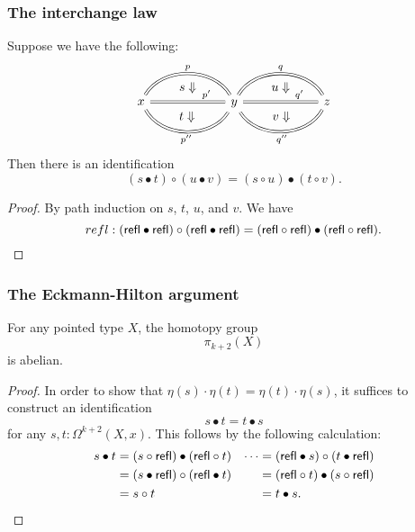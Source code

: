 \documentclass[handout]{beamer}
\newcommand{\ct}{\bullet}
\newcommand{\refl}{\mathsf{refl}}
\begin{document}
\begin{frame}
  \frametitle{The interchange law}
  \begin{lemma}
    Suppose we have the following:
    \begin{equation*}
      \begin{tikzcd}[ampersand replacement=\&,column sep=6em]
        x \arrow[r,bend left=60,equals,""{name=A,below},"{p}"]
        \arrow[r,equals,""{name=B,above},""{name=C,below},"{p'}"{near end}]
        \arrow[r,bend right=60,equals,""{name=D,above},"{p''}"']
        \& y
        \arrow[r,bend left=60,equals,""{name=AA,below},"{q}"]
        \arrow[r,equals,""{name=BA,above},""{name=CA,below},"{q'}"{near end}]
        \arrow[r,bend right=60,equals,""{name=DA,above},"{q''}"']
        \& z
        \arrow[from=A,to=B,phantom,"s\Downarrow"]
        \arrow[from=C,to=D,phantom,"t\Downarrow"]
        \arrow[from=AA,to=BA,phantom,"u\Downarrow"]
        \arrow[from=CA,to=DA,phantom,"v\Downarrow"]
      \end{tikzcd}
    \end{equation*}
    Then there is an identification
    \begin{equation*}
      (s\bullet t)\circ (u\bullet v)=(s\circ u)\bullet (t\circ v).
    \end{equation*}
  \end{lemma}\pause
  
  \begin{proof}
    By path induction on $s$, $t$, $u$, and $v$. We have
    \begin{equation*}
      refl : (\refl\bullet\refl)\circ(\refl\bullet\refl)=(\refl\circ\refl)\bullet(\refl\circ\refl).\qedhere
    \end{equation*}
  \end{proof}
\end{frame}

\begin{frame}
  \frametitle{The Eckmann-Hilton argument}
  \begin{theorem}
    For any pointed type $X$, the homotopy group
    \begin{equation*}
      \pi_{k+2}(X)
    \end{equation*}
    is abelian.
  \end{theorem}
  \begin{proof}
    In order to show that $\eta(s)\cdot\eta(t)=\eta(t)\cdot\eta(s)$, it suffices to construct an identification
    \begin{equation*}
      s\ct t = t \ct s
    \end{equation*}
    for any $s,t:\Omega^{k+2}(X,x)$. This follows by the following calculation:
    \begin{align*}
      s\ct t & = (s \circ \refl) \ct (\refl \circ t) & \cdots & = (\refl \ct s) \circ (t \ct \refl) \\
             & = (s \ct \refl) \circ (\refl \ct t) & & = (\refl \circ t) \ct (s \circ \refl) \\
             & = s \circ t & & = t \ct s. \qedhere
    \end{align*}
  \end{proof}
\end{frame}
\end{document}
